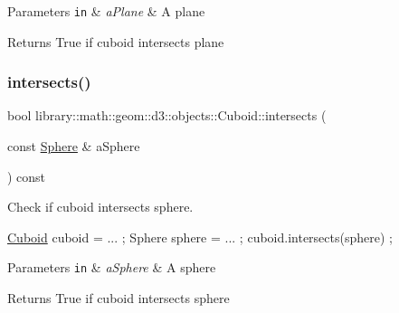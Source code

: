 \begin{DoxyParams}[1]{Parameters}
\mbox{\tt in}  & {\em a\+Plane} & A plane \\
\hline
\end{DoxyParams}
\begin{DoxyReturn}{Returns}
True if cuboid intersects plane 
\end{DoxyReturn}
\mbox{\label{classlibrary_1_1math_1_1geom_1_1d3_1_1objects_1_1_cuboid_aae03606f06dfb2e7c97d3c1aed7e28d5}} 
\subsubsection{\texorpdfstring{intersects()}{intersects()}\hspace{0.1cm}{\footnotesize\ttfamily [7/9]}}
{\footnotesize\ttfamily bool library\+::math\+::geom\+::d3\+::objects\+::\+Cuboid\+::intersects (\begin{DoxyParamCaption}\item[{const \hyperlink{classlibrary_1_1math_1_1geom_1_1d3_1_1objects_1_1_sphere}{Sphere} \&}]{a\+Sphere }\end{DoxyParamCaption}) const}



Check if cuboid intersects sphere. 


\begin{DoxyCode}
\hyperlink{classlibrary_1_1math_1_1geom_1_1d3_1_1objects_1_1_cuboid_ac42299f962fab284a76a46d4ea4e6fa2}{Cuboid} cuboid = ... ;
Sphere sphere = ... ;
cuboid.intersects(sphere) ;
\end{DoxyCode}



\begin{DoxyParams}[1]{Parameters}
\mbox{\tt in}  & {\em a\+Sphere} & A sphere \\
\hline
\end{DoxyParams}
\begin{DoxyReturn}{Returns}
True if cuboid intersects sphere 
\end{DoxyReturn}
\mbox{\label{classlibrary_1_1math_1_1geom_1_1d3_1_1objects_1_1_cuboid_a98a8c049dac309e6f07e3417803f23b4}} 
